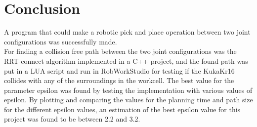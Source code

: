 \documentclass[11pt]{article}
\begin{document}
\newpage
\section{Conclusion}
A program that could make a robotic pick and place operation between two joint configurations was successfully made.\\[0.2cm]


\noindent For finding a collision free path between the two joint configurations was the RRT-connect algorithm implemented in a C++ project, and the found path was put in a LUA script and run in RobWorkStudio for testing if the KukaKr16 collides with any of the surroundings in the workcell. The best value for the parameter epsilon was found by testing the implementation with various values of epsilon. By plotting and comparing the values for the planning time and path size for the different epsilon values, an estimation of the best epsilon value for this project was found to be between 2.2 and 3.2.
\end{document}
